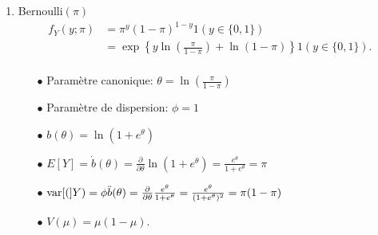 \begin{solution}{5.1}
\begin{enumerate}
\item Bernoulli$(\pi)$
\begin{align*}
f_{Y}(y;\pi)&=\pi^{y}(1-\pi)^{1-y}1(y \in \{0,1\})\\
&=\exp\left\{y\ln\left(\frac{\pi}{1-\pi}\right)+\ln(1-\pi)\right\}1(y \in \{0,1\}).\\
\end{align*}
\begin{itemize}
\item[$\bullet$] Paramètre canonique: $\theta=\ln\left(\frac{\pi}{1-\pi}\right)$
\item[$\bullet$] Paramètre de dispersion:  $\phi=1$
\item[$\bullet$] $b(\theta)=\ln(1+e^{\theta})$
\item[$\bullet$] $E[Y]=\dot{b}(\theta)=\frac{\partial}{\partial\theta}\ln(1+e^{\theta})=\frac{e^{\theta}}{1+e^\theta}=\pi$
\item[$\bullet$] $\mathrm{var} [ ( ]Y)=\phi\ddot{b}(\theta)=\frac{\partial}{\partial\theta}\frac{e^{\theta}}{1+e^\theta}=\frac{e^\theta}{(1+e^\theta)^2}=\pi(1-\pi)$
\item[$\bullet$] $V(\mu)=\mu(1-\mu)$.
\end{itemize}


\end{enumerate}
\end{solution}
